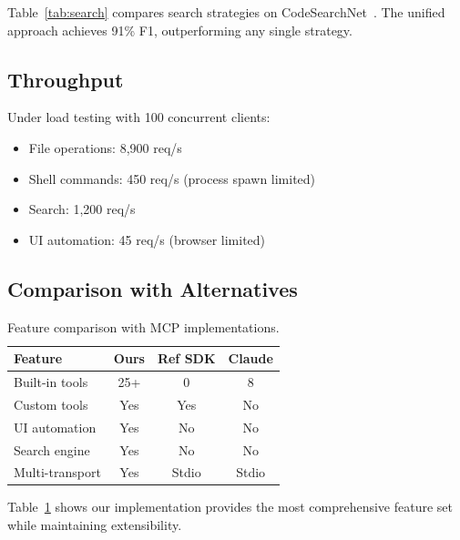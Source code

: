 Table~\ref{tab:search} compares search strategies on CodeSearchNet~\cite{codesearchnet2019}. The unified approach achieves 91\% F1, outperforming any single strategy.

\subsection{Throughput}

Under load testing with 100 concurrent clients:
\begin{itemize}
    \item File operations: 8,900 req/s
    \item Shell commands: 450 req/s (process spawn limited)
    \item Search: 1,200 req/s
    \item UI automation: 45 req/s (browser limited)
\end{itemize}

\subsection{Comparison with Alternatives}

\begin{table}[h]
\centering
\caption{Feature comparison with MCP implementations.}
\label{tab:compare}
\begin{tabular}{lccc}
\toprule
\textbf{Feature} & \textbf{Ours} & \textbf{Ref SDK} & \textbf{Claude} \\
\midrule
Built-in tools & 25+ & 0 & 8 \\
Custom tools & Yes & Yes & No \\
UI automation & Yes & No & No \\
Search engine & Yes & No & No \\
Multi-transport & Yes & Stdio & Stdio \\
\bottomrule
\end{tabular}
\end{table}

Table~\ref{tab:compare} shows our implementation provides the most comprehensive feature set while maintaining extensibility.

